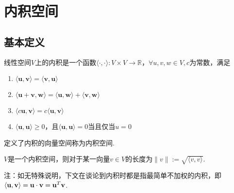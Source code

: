 
\section{内积空间}
\subsection{基本定义}
\begin{definition}[内积空间]
线性空间$V$上的内积是一个函数$\langle\cdot,\cdot\rangle:V\times V\to\mathbb{R}$，$\forall u,v,w\in V,c$为常数，满足
\begin{enumerate}
	\itemsep -3pt
	\item $\langle \mathbf{u},\mathbf{v} \rangle=\langle \mathbf{v},\mathbf{u} \rangle$
	\item $\langle \mathbf{u}+\mathbf{v},\mathbf{w} \rangle=\langle \mathbf{u},\mathbf{w} \rangle+\langle \mathbf{v},\mathbf{w} \rangle$
	\item $\langle c\mathbf{u},\mathbf{v} \rangle=c\langle \mathbf{u},\mathbf{v} \rangle$
	\item $\langle \mathbf{u},\mathbf{u} \rangle\geq 0$，且$\langle \mathbf{u},\mathbf{u} \rangle=0$当且仅当$u=0$
\end{enumerate}
定义了内积的向量空间称为内积空间.
\end{definition}
\begin{definition}[长度/模/范数]
$V$是一个内积空间，则对于某一向量$v\in V$的长度为$\|v\|:=\sqrt{\langle v,v\rangle}$.
\end{definition}
注：如无特殊说明，下文在谈论到内积时都是指最简单不加权的内积，即$\langle \mathbf{u},\mathbf{v} \rangle=\mathbf{u}\cdot\mathbf{v}=\mathbf{u}^T\mathbf{v}$.

